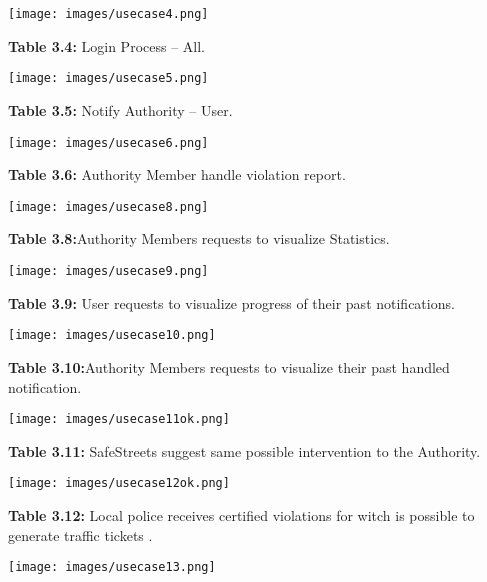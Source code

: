 \documentclass[12pt]{article}
\begin{document}
\newpage


 \texttt{[image: images/usecase4.png]}                  
		 
		  \textbf{Table 3.4:} Login Process – All.
		  
 \texttt{[image: images/usecase5.png]}                  
		 
		  \textbf{Table 3.5:} Notify Authority – User.
		  
\newpage

 \texttt{[image: images/usecase6.png]}                  
		 
		  \textbf{Table 3.6:} Authority Member handle violation report. 

\newpage

\begin{center}
\texttt{[image: images/usecase8.png]}                 

\textbf{Table 3.8:}Authority Members requests to visualize Statistics. 
\end{center}

\begin{center}
\texttt{[image: images/usecase9.png]}                 

\textbf{Table 3.9:} User requests to visualize progress of their past notifications. 
\end{center}

\newpage

\begin{center}
\texttt{[image: images/usecase10.png]}                 

\textbf{Table 3.10:}Authority Members requests to visualize their past handled notification.
\end{center}

\begin{center}
\texttt{[image: images/usecase11ok.png]}                 

\textbf{Table 3.11:} SafeStreets suggest same possible intervention to the Authority.
\end{center}

\newpage
 \texttt{[image: images/usecase12ok.png]}                  
		 
		  \textbf{Table 3.12:} Local police receives certified violations for  witch is possible to generate traffic tickets .

\newpage
 \texttt{[image: images/usecase13.png]}                  
		 
\end{document}
